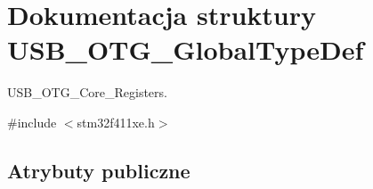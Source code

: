 \hypertarget{struct_u_s_b___o_t_g___global_type_def}{}\section{Dokumentacja struktury U\+S\+B\+\_\+\+O\+T\+G\+\_\+\+Global\+Type\+Def}
\label{struct_u_s_b___o_t_g___global_type_def}


U\+S\+B\+\_\+\+O\+T\+G\+\_\+\+Core\+\_\+\+Registers.  




{\ttfamily \#include $<$stm32f411xe.\+h$>$}

\subsection*{Atrybuty publiczne}
